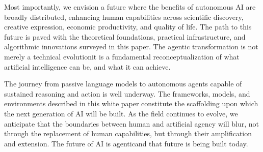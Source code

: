 Most importantly, we envision a future where the benefits of autonomous AI are broadly distributed, enhancing human capabilities across scientific discovery, creative expression, economic productivity, and quality of life. The path to this future is paved with the theoretical foundations, practical infrastructure, and algorithmic innovations surveyed in this paper. The agentic transformation is not merely a technical evolutionit is a fundamental reconceptualization of what artificial intelligence can be, and what it can achieve.

The journey from passive language models to autonomous agents capable of sustained reasoning and action is well underway. The frameworks, models, and environments described in this white paper constitute the scaffolding upon which the next generation of AI will be built. As the field continues to evolve, we anticipate that the boundaries between human and artificial agency will blur, not through the replacement of human capabilities, but through their amplification and extension. The future of AI is agenticand that future is being built today.
